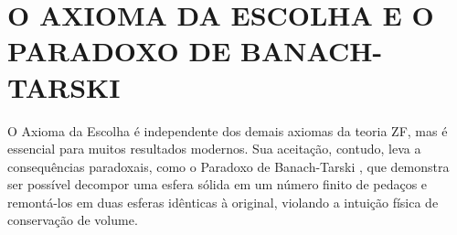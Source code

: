 
\chapter{O AXIOMA DA ESCOLHA E O PARADOXO DE BANACH-TARSKI}
\label{chap:escolha}

O Axioma da Escolha é independente dos demais axiomas da teoria ZF, mas é essencial para muitos resultados modernos. Sua aceitação, contudo, leva a consequências paradoxais, como o Paradoxo de Banach-Tarski \parencite{wapner2007}, que demonstra ser possível decompor uma esfera sólida em um número finito de pedaços e remontá-los em duas esferas idênticas à original, violando a intuição física de conservação de volume.



    \label{def:metrica}


